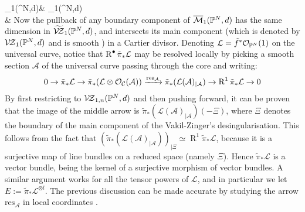 \bcd
{}_1(\PP^N,d)\ar[d]\ar[r] & \oM_1(\PP^N,d)\ar[d] \\
\widetilde{\MM}\ar[r] & \Mwt
\ecd
Now the pullback of any boundary component of $\overline{\mathcal{M}}_1(\mathbb P^N,d)$ has the same dimension in $\widetilde{\mathcal{V\!Z}}_1(\mathbb P^N,d)$, and intersects its main component (which is denoted by $\mathcal{V\!Z}_1(\mathbb P^N,d)$ and is smooth \cite[Theorem 1.1(1)]{VZ}\cite[Theorem 2.9]{HL}) in a Cartier divisor. Denoting $\mathcal L=\tilde f^*\mathcal{O}_{\mathbb P^N}(1)$ on the universal curve, notice that $\operatorname{R}^{\bullet}\tilde{\pi}_*\mathcal L$ may be resolved locally by picking a smooth section $\mathcal A$ of the universal curve passing through the core and writing:
\[0\rightarrow \tilde\pi_*\mathcal L\rightarrow \tilde\pi_*(\mathcal L\otimes \mathcal{O}_{\mathcal C}(\mathcal A))\xrightarrow{\mathrm{res}_{\mathcal A}} \tilde\pi_*(\mathcal L(\mathcal A)_{|\mathcal A})\rightarrow \operatorname{R}^1\tilde\pi_*\mathcal L\rightarrow 0\]
By first restricting to $\mathcal{V\!Z}_{1,n}(\mathbb P^N,d)$ and then pushing forward, it can be proven that the image of the middle arrow is $\tilde\pi_*(\mathcal L(\mathcal A)_{|\mathcal A})(-\Xi)$, where $\Xi$ denotes the boundary of the main component of the Vakil-Zinger's desingularisation. This follows from the fact that $\left(\tilde\pi_*(\mathcal L(\mathcal A)_{|\mathcal A})\right)_{|\Xi}\simeq \operatorname{R}^1\tilde\pi_*\mathcal L$, because it is a surjective map of line bundles on a reduced space (namely $\Xi$). Hence $\tilde\pi_*\mathcal L$ is a vector bundle, being the kernel of a surjective morphism of vector bundles. A similar argument works for all the tensor powers of $\mathcal L$, and in particular we let $E:=\tilde\pi_*\mathcal L^{\otimes l}$. The previous discussion can be made accurate by studying the arrow $\mathrm{res}_{\mathcal A}$ in local coordinates \cite[Proposition 4.13]{HL}.


